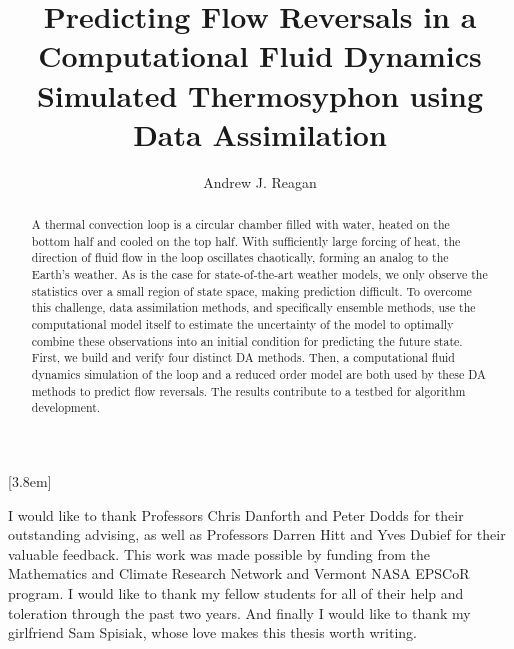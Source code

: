\documentclass[12pt]{report}
\title{Predicting Flow Reversals in a Computational Fluid Dynamics Simulated Thermosyphon using Data Assimilation}
\author{Andrew J. Reagan}
\begin{document}
              [3.8em]
              {}
              {\contentslabel{2.3em}}
              {\hspace*{-2.3em}}
              {\contentspage}

\maketitle
\makeacceptance

\begin{abstract}
A thermal convection loop is a circular chamber filled with water, heated on the bottom half and cooled on the top half.
With sufficiently large forcing of heat, the direction of fluid flow in the loop oscillates chaotically, forming an analog to the Earth's weather.
As is the case for state-of-the-art weather models, we only observe the statistics over a small region of state space, making prediction difficult.
To overcome this challenge, data assimilation methods, and specifically ensemble methods, use the computational model itself to estimate the uncertainty of the model to optimally combine these observations into an initial condition for predicting the future state.
First, we build and verify four distinct DA methods.
Then, a computational fluid dynamics simulation of the loop and a reduced order model are both used by these DA methods to predict flow reversals.
The results contribute to a testbed for algorithm development.

\end{abstract}


\begin{acknowledgements}
I would like to thank Professors Chris Danforth and Peter Dodds for their outstanding advising, as well as Professors Darren Hitt and Yves Dubief for their valuable feedback.
This work was made possible by funding from the Mathematics and Climate Research Network and Vermont NASA EPSCoR program.
I would like to thank my fellow students for all of their help and toleration through the past two years.
And finally I would like to thank my girlfriend Sam Spisiak, whose love makes this thesis worth writing.
\end{acknowledgements}
\end{document}
